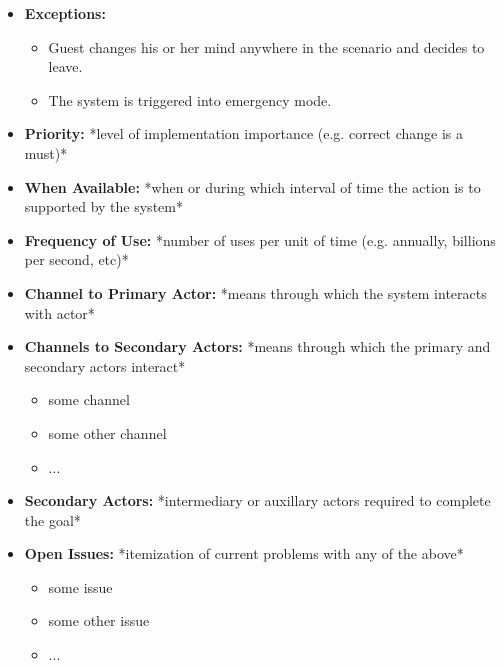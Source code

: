 \documentclass[12pt]{article}
\begin{document}
\begin{itemize}
        \item[]\textbf{Exceptions:}
            \begin{itemize}
                \item[] Guest changes his or her mind anywhere in the scenario and decides to leave.
                \item[] The system is triggered into emergency mode.
            \end{itemize}

        \item[]\textbf{Priority:}
            *level of implementation importance (e.g. correct change is a must)*

        \item[]\textbf{When Available:}
            *when or during which interval of time the action is to supported by the system*

        \item[]\textbf{Frequency of Use:}
            *number of uses per unit of time (e.g. annually, billions per second, etc)*

        \item[]\textbf{Channel to Primary Actor:}
            *means through which the system interacts with actor*

        \item[]\textbf{Channels to Secondary Actors:}
            *means through which the primary and secondary actors interact*
            \begin{itemize}
                \item[] some channel
                \item[] some other channel
                \item[] ...
            \end{itemize}
        \item[]\textbf{Secondary Actors:}
            *intermediary or auxillary actors required to complete the goal*

        \item[]\textbf{Open Issues:}
            *itemization of current problems with any of the above*
            \begin{itemize}
                \item[] some issue
                \item[] some other issue
                \item[] ...
            \end{itemize}
    \end{itemize}
\end{document}
